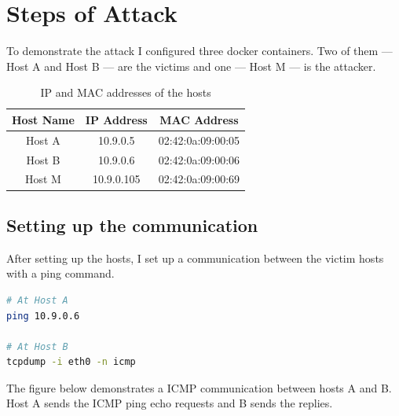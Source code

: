 \documentclass[12pt]{article}
\begin{document}
\FloatBarrier

\vspace{1cm}

\section{Steps of Attack}

To demonstrate the attack I configured three docker containers. Two of them ---
Host A and Host B --- are the victims and one --- Host M --- is the attacker.

\vspace{1cm}

\begin{table}[h!]
    \centering
    \begin{tabular}{ |c|c|c| }
        \hline
        Host Name & IP Address & MAC Address \\
        \hline
        \hline
        Host A & 10.9.0.5 & 02:42:0a:09:00:05 \\
        \hline
        Host B & 10.9.0.6 & 02:42:0a:09:00:06 \\
        \hline
        Host M & 10.9.0.105 & 02:42:0a:09:00:69 \\
        \hline
    \end{tabular}
    \caption{IP and MAC addresses of the hosts}
\end{table}

\vspace{1cm}

\subsection{Setting up the communication}

After setting up the hosts, I set up a communication between the victim hosts
with a ping command.

\vspace{1cm}

\begin{lstlisting}[language=bash,caption={Shell commands},captionpos=b]
# At Host A
ping 10.9.0.6

# At Host B
tcpdump -i eth0 -n icmp
\end{lstlisting}

\vspace{1cm}

The figure below demonstrates a ICMP communication between hosts A and B. Host A
sends the ICMP ping echo requests and B sends the replies.
\end{document}
